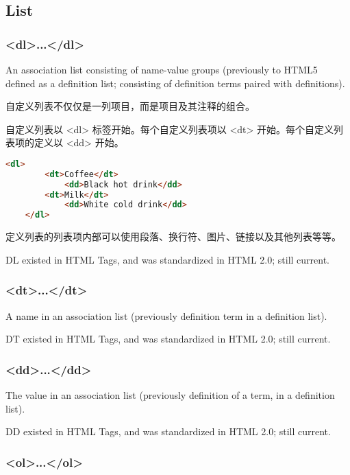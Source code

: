 \subsection{List}


\subsubsection{<dl>...</dl>}

An association list consisting of name-value groups (previously to HTML5 defined as a definition list; consisting of definition terms paired with definitions).

自定义列表不仅仅是一列项目，而是项目及其注释的组合。

自定义列表以 <dl> 标签开始。每个自定义列表项以 <dt> 开始。每个自定义列表项的定义以 <dd> 开始。

\begin{lstlisting}[language=HTML]
	<dl>
		<dt>Coffee</dt>
			<dd>Black hot drink</dd>
		<dt>Milk</dt>
			<dd>White cold drink</dd>
	</dl>
\end{lstlisting}

定义列表的列表项内部可以使用段落、换行符、图片、链接以及其他列表等等。

DL existed in HTML Tags, and was standardized in HTML 2.0; still current.



\subsubsection{<dt>...</dt>}


A name in an association list (previously definition term in a definition list).

DT existed in HTML Tags, and was standardized in HTML 2.0; still current.




\subsubsection{<dd>...</dd>}

The value in an association list (previously definition of a term, in a definition list).

DD existed in HTML Tags, and was standardized in HTML 2.0; still current.






\subsubsection{<ol>...</ol>}


